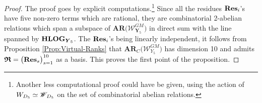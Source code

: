 \documentclass[11pt]{amsart}
\newcommand{\sk}{\smallskip}
\begin{document}
\begin{proof} The proof goes by explicit computations.\footnote{Another less computational proof  could have be given, using the action of $W_{D_5}\simeq \boldsymbol{\mathscr W}_{\hspace{-0.05cm}D_5}$ on the set of combinatorial abelian relations.} 
Since all the residues ${\bf Res}_i$'s have five non-zero terms which are rational, 
 they are  combinatorial 2-abelian relations which span a subspace of $\boldsymbol{AR}\big(\boldsymbol{\mathcal W}_{\boldsymbol{Y}_5}^{GM}\big)$ in direct sum with the line spanned by ${\bf HLOG}_{ \boldsymbol{Y}_5}$. The ${\bf Res}_i$'s being linearly independent, it follows from 
Proposition \ref{Prop:Virtual-Ranks} that $\boldsymbol{AR}_C\big(\boldsymbol{\mathcal W}_{Y_5}^{GM}\big)$ has dimension 10 and admits $\boldsymbol{\mathfrak R}=\big( {\bf  Res}_{s}\big)_{s=1}^{10}$ as a basis. This proves the first point of the proposition. 
\sk


\end{proof}
\end{document}
